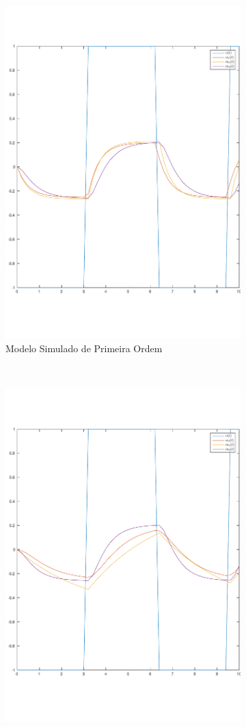 \documentclass[a4paper,11pt]{article}
\begin{document}
\begin{figure}[H]
    \centering
    \begin{subfigure}[b]{0.5\textwidth}
        \centering
        \includegraphics[width=0.8\linewidth,trim={0 2cm 0 0}]{tex/img/model1Evaluation.pdf}
        \caption{Modelo Simulado de Primeira Ordem}
    \end{subfigure}%
    ~ 
    \begin{subfigure}[b]{0.5\textwidth}
        \centering
        \includegraphics[width=0.8\linewidth,trim={0 2cm 0 0}]{tex/img/model2Evaluation.pdf}

\end{subfigure}
\end{figure}
\end{document}
